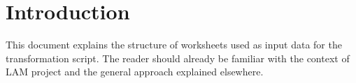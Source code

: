 
\section{Introduction}\label{ariaid-title1}


This document explains the structure of worksheets used as input data
for the transformation script. The reader should already be familiar
with the context of LAM project and the general approach explained
elsewhere.
